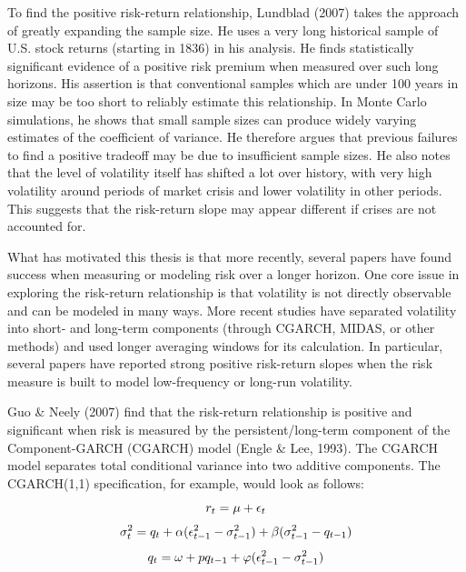 \documentclass[12pt]{article}
\begin{document}
To find the positive risk-return relationship, Lundblad (2007) takes the approach of greatly expanding the sample size. He uses a very long historical sample of U.S. stock returns (starting in 1836) in his analysis. He finds statistically significant evidence of a positive risk premium when measured over such long horizons. His assertion is that conventional samples which are under 100 years in size may be too short to reliably estimate this relationship. In Monte Carlo simulations, he shows that small sample sizes can produce widely varying estimates of the coefficient of variance. He therefore argues that previous failures to find a positive tradeoff may be due to insufficient sample sizes. He also notes that the level of volatility itself has shifted a lot over history, with very high volatility around periods of market crisis and lower volatility in other periods. This suggests that the risk-return slope may appear different if crises are not accounted for.\par
What has motivated this thesis is that more recently, several papers have found success when measuring or modeling risk over a longer horizon. One core issue in exploring the risk-return relationship is that volatility is not directly observable and can be modeled in many ways. More recent studies have separated volatility into short- and long-term components (through CGARCH, MIDAS, or other methods) and used longer averaging windows for its calculation. In particular, several papers have reported strong positive risk-return slopes when the risk measure is built to model low-frequency or long-run volatility.\par
Guo \& Neely (2007) find that the risk-return relationship is positive and significant when risk is measured by the persistent/long-term component of the Component-GARCH (CGARCH) model (Engle \& Lee, 1993). The CGARCH model separates total conditional variance into two additive components. The CGARCH(1,1) specification, for example, would look as follows:
\begin{equation}
\nonumber
r_t=\mu+\epsilon_t\\
\end{equation}
\begin{equation}
\nonumber
\sigma_t^2=q_t+\alpha(\epsilon_{t-1}^2-\sigma_{t-1}^2)+\beta(\sigma_{t-1}^2-q_{t-1})\\
\end{equation}
\begin{equation}
\nonumber
q_t=\omega+pq_{t-1}+\varphi(\epsilon_{t-1}^2-\sigma_{t-1}^2)\\
\end{equation}
\end{document}

